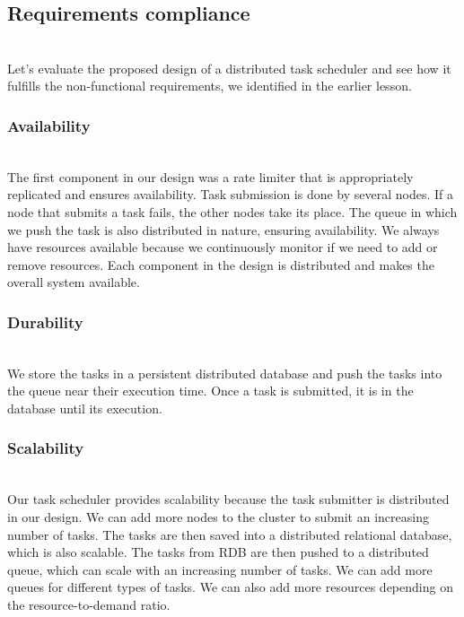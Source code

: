 

\subsection{Requirements compliance}\label{LQmrmxF8gAfZZy_7Q-DQg}
\\
Let's evaluate the proposed design of a distributed task scheduler and see how it fulfills the non-functional requirements, we identified in the earlier lesson.

\subsubsection{Availability}\label{Ke6bIyVNIcYgHJmEOafqo}
\\
The first component in our design was a rate limiter that is appropriately replicated and ensures availability. Task submission is done by several nodes. If a node that submits a task fails, the other nodes take its place. The queue in which we push the task is also distributed in nature, ensuring availability. We always have resources available because we continuously monitor if we need to add or remove resources. Each component in the design is distributed and makes the overall system available.\\

\subsubsection{Durability}\label{4d4KFbDhZDKBN3eNl9u7-}
\\
We store the tasks in a persistent distributed database and push the tasks into the queue near their execution time. Once a task is submitted, it is in the database until its execution.\\

\subsubsection{Scalability}\label{Y41wgHq0MAQllkCYmZqhu}
\\
\hfill\break
Our task scheduler provides scalability because the task submitter is distributed in our design. We can add more nodes to the cluster to submit an increasing number of tasks. The tasks are then saved into a distributed relational database, which is also scalable. The tasks from RDB are then pushed to a distributed queue, which can scale with an increasing number of tasks. We can add more queues for different types of tasks. We can also add more resources depending on the resource-to-demand ratio.


